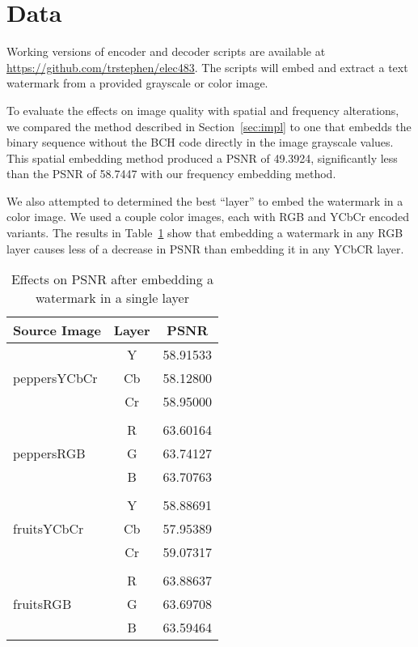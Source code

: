 \section{Data}\label{sec:data}
Working versions of encoder and decoder scripts are available at \url{https://github.com/trstephen/elec483}.
The scripts will embed and extract a text watermark from a provided grayscale or color image.

To evaluate the effects on image quality  with spatial and frequency alterations, we compared the method described in Section~\ref{sec:impl} to one that embedds the binary sequence without the BCH code directly in the image grayscale values.
This spatial embedding method produced a PSNR of 49.3924, significantly less than the PSNR of 58.7447 with our frequency embedding method.

We also attempted to determined the best ``layer'' to embed the watermark in a color image.
We used a couple color images, each with RGB and YCbCr encoded variants.
The results in Table~\ref{tbl:color-psnr} show that embedding a watermark in any RGB layer causes less of a decrease in PSNR than embedding it in any YCbCR layer.

\begin{table}[htpb]
  \centering
  \caption{Effects on PSNR after embedding a watermark in a single layer}
  \label{tbl:color-psnr}
  \begin{tabular}{@{}lcl@{}}
    \toprule
    \multicolumn{1}{c}{Source Image} & Layer & \multicolumn{1}{c}{PSNR}     \\
    \midrule
    \multirow{3}{*}{peppersYCbCr}
       & Y   & 58.91533 \\
       & Cb  & 58.12800 \\
       & Cr  & 58.95000 \\
    &  &  \\
    \multirow{3}{*}{peppersRGB}
       & R   & 63.60164 \\
       & G   & 63.74127 \\
       & B   & 63.70763 \\
    &  &  \\
    \multirow{3}{*}{fruitsYCbCr}
      & Y   & 58.88691 \\
      & Cb  & 57.95389 \\
      & Cr  & 59.07317 \\
    &  &  \\
    \multirow{3}{*}{fruitsRGB}
      & R   & 63.88637 \\
      & G   & 63.69708 \\
      & B   & 63.59464 \\
    \bottomrule
  \end{tabular}
\end{table}

